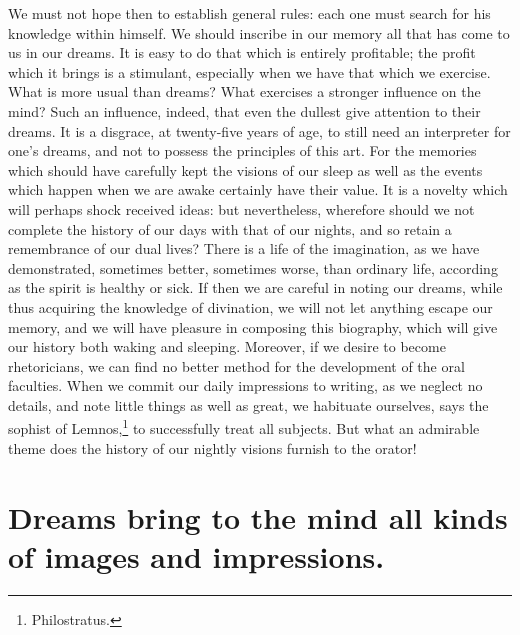 \documentclass[12pt]{article}
\begin{document}
We must not hope then to establish general rules: each one must search for his
knowledge within himself. We should inscribe in our memory all that has come to
us in our dreams. It is easy to do that which is entirely profitable; the
profit which it brings is a stimulant, especially when we have that which we
exercise. What is more usual than dreams? What exercises a stronger influence
on the mind? Such an influence, indeed, that even the dullest give attention to
their dreams. It is a disgrace, at twenty-five years of age, to still need an
interpreter for one's dreams, and not to possess the principles of this art.
For the memories which should have carefully kept the visions of our sleep as
well as the events which happen when we are awake certainly have their value.
It is a novelty which will perhaps shock received ideas: but nevertheless,
wherefore should we not complete the history of our days with that of our
nights, and so retain a remembrance of our dual lives? There is a life of the
imagination, as we have demonstrated, sometimes better, sometimes worse, than
ordinary life, according as the spirit is healthy or sick. If then we are
careful in noting our dreams, while thus acquiring the knowledge of divination,
we will not let anything escape our memory, and we will have pleasure in
composing this biography, which will give our history both waking and sleeping.
Moreover, if we desire to become rhetoricians, we can find no better method for
the development of the oral faculties. When we commit our daily impressions to
writing, as we neglect no details, and note little things as well as great, we
habituate ourselves, says the sophist of Lemnos,\footnote{Philostratus.} to
successfully treat all subjects. But what an admirable theme does the history
of our nightly visions furnish to the orator!


\section{Dreams bring to the mind all kinds of images and impressions.}
\end{document}
